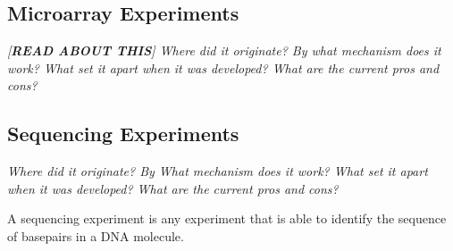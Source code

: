 		\subsection{Microarray Experiments}
		
		\emph{[\textbf{READ ABOUT THIS}] Where did it originate? By what mechanism does it work? What set it apart when it was developed? What are the current pros and cons?}
		
		\subsection{Sequencing Experiments}
		
		\emph{Where did it originate? By What mechanism does it work? What set it apart when it was developed? What are the current pros and cons?}
		
		A sequencing experiment is any experiment that is able to identify the sequence of basepairs in a DNA molecule.
		
		
		
		
		
		
		
		
		